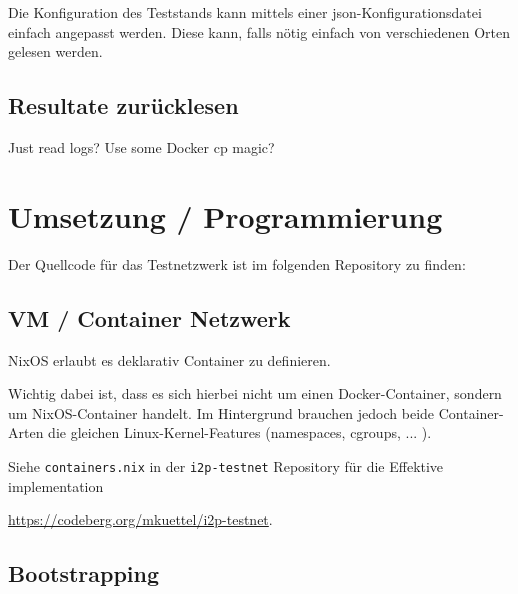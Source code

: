 Die Konfiguration des Teststands kann mittels einer json-Konfigurationsdatei einfach angepasst werden.
Diese kann, falls nötig einfach von verschiedenen Orten gelesen werden.

\subsection{Resultate zurücklesen}

Just read logs? Use some Docker cp magic?

\section{Umsetzung / Programmierung}

Der Quellcode für das Testnetzwerk ist im folgenden Repository zu finden:

\subsection{VM / Container Netzwerk}

NixOS erlaubt es deklarativ Container zu definieren.

%

Wichtig dabei ist, dass es sich hierbei nicht um einen Docker-Container, sondern um NixOS-Container handelt.
Im Hintergrund brauchen jedoch beide Container-Arten die gleichen Linux-Kernel-Features (namespaces, cgroups, ... ).


Siehe \lstinline|containers.nix| in der \lstinline|i2p-testnet| Repository für die Effektive implementation


\url{https://codeberg.org/mkuettel/i2p-testnet}.

\subsection{Bootstrapping}

